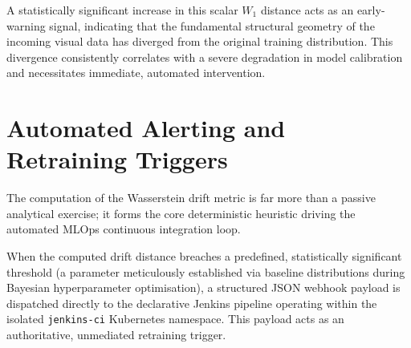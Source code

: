 A statistically significant increase in this scalar $W_1$ distance acts as an early-warning signal, indicating that the fundamental structural geometry of the incoming visual data has diverged from the original training distribution. This divergence consistently correlates with a severe degradation in model calibration and necessitates immediate, automated intervention.

\section{Automated Alerting and Retraining Triggers}
\label{sec:automated_retraining}

The computation of the Wasserstein drift metric is far more than a passive analytical exercise; it forms the core deterministic heuristic driving the automated MLOps continuous integration loop.

When the computed drift distance breaches a predefined, statistically significant threshold (a parameter meticulously established via baseline distributions during Bayesian hyperparameter optimisation), a structured JSON webhook payload is dispatched directly to the declarative Jenkins pipeline operating within the isolated \texttt{jenkins-ci} Kubernetes namespace. This payload acts as an authoritative, unmediated retraining trigger.

